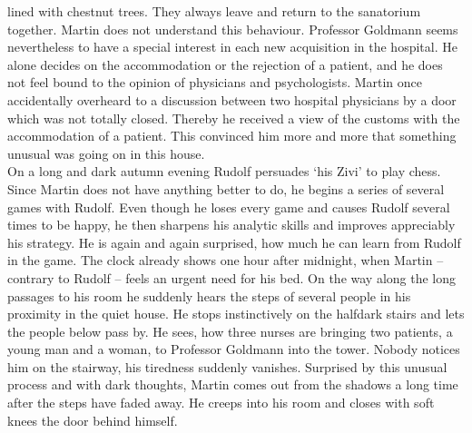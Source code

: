 lined with chestnut trees. 
They always leave and return to the sanatorium together.
Martin does not understand this behaviour. 
Professor Goldmann seems nevertheless to have a special interest in each new 
acquisition in the hospital. 
He alone decides on the accommodation or the rejection of a patient, and he does not 
feel bound to the opinion of physicians and psychologists. 
Martin once accidentally overheard to a discussion between two hospital physicians 
by a door which was not totally closed. 
Thereby he received a view of the customs with the accommodation of a patient. 
This convinced him more and more that something unusual was going on in this house. 
\[\] 
On a long and dark autumn evening Rudolf persuades `his Zivi' to play chess. 
Since Martin does not have anything better to do, he begins a series of several 
games with Rudolf. 
Even though he loses every game and causes Rudolf several times to be happy, he 
then sharpens his analytic skills and improves appreciably his strategy. 
He is again and again surprised, how much he can learn from Rudolf in the game. 
The clock already shows one hour after midnight, when Martin -- contrary to Rudolf -- 
feels an urgent need for his bed.
On the way along the long passages to his room he suddenly hears the steps of 
several people in his proximity in the quiet house. 
He stops instinctively on the halfdark stairs and lets the people below pass by. 
He sees, how three nurses are bringing two patients, a young man and a woman, to 
Professor Goldmann into the tower. 
Nobody notices him on the stairway, his tiredness suddenly vanishes. 
Surprised by this unusual process and with dark thoughts, Martin comes out from the 
shadows a long time after the steps have faded away. 
He creeps into his room and closes with soft knees the door behind himself.


